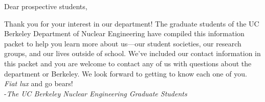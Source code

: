 

Dear prospective students,

Thank you for your interest in our department! 
The graduate students of the UC Berkeley Department of Nuclear Engineering have compiled this information packet to help you learn more about us---our student societies, our research groups, and our lives outside of school. 
We've included our contact information in this packet and you are welcome to contact any of us with questions about the department or Berkeley. 
We look forward to getting to know each one of you. 
\textit{Fiat lux} and go bears! \\

\hfill-\textit{The UC Berkeley Nuclear Engineering Graduate Students}

\vspace{3cm}
\begin{minipage}{\textwidth}
	\tableofcontents
\end{minipage}

\restoregeometry
